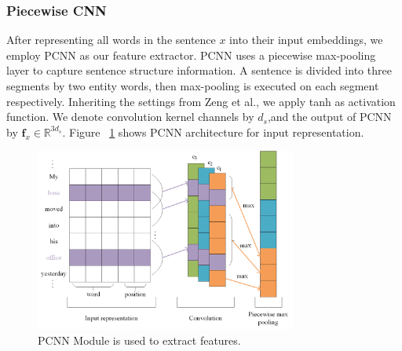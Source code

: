 \documentclass[conference]{IEEEtran}
\begin{document}
\subsubsection*{Piecewise CNN}
After representing all words in the sentence $x$ into their input embeddings, we employ PCNN as our feature extractor.
PCNN uses a piecewise max-pooling layer to capture sentence structure information. 
A sentence is divided into three segments by two entity words, then max-pooling is executed on each segment respectively.
Inheriting the settings from Zeng et al.\cite{zeng2015distant}, we apply tanh as activation function.
We denote convolution kernel channels by $d_{s}$,and the output of PCNN by $\mathbf{f}_x \in \mathbb{R}^{3d_{s}}$.
Figure ~\ref{Architecture PCNN} shows PCNN architecture for input representation.

\begin{figure}[h]
  \includegraphics[height=6cm]{PCNN.png}
  \caption{PCNN Module is used to extract features.}
  \label{Architecture PCNN}
\end{figure}
\end{document}
